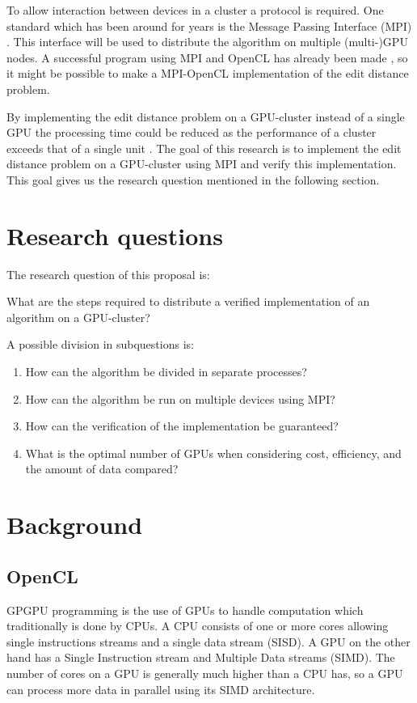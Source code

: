 \documentclass{sig-alternate-br}
\begin{document}
To allow interaction between devices in a cluster a protocol is required.
One standard which has been around for years is the Message Passing Interface (MPI) \cite{MPI}.
This interface will be used to distribute the algorithm on multiple (multi-)GPU nodes.
A successful program using MPI and OpenCL has already been made \cite{Cluster}, so it might be possible to make a MPI-OpenCL implementation of the edit distance problem.

By implementing the edit distance problem on a GPU-cluster instead of a single GPU the processing time could be reduced as the performance of a cluster exceeds that of a single unit \cite{Cluster}.
The goal of this research is to implement the edit distance problem on a GPU-cluster using MPI and verify this implementation.
This goal gives us the research question mentioned in the following section.

\section{Research questions}
The research question of this proposal is:

What are the steps required to distribute a verified implementation of an algorithm on a GPU-cluster?

A possible division in subquestions is:
\begin{enumerate}
    \item How can the algorithm be divided in separate processes?
    \item How can the algorithm be run on multiple devices using MPI?
    \item How can the verification of the implementation be guaranteed?
    \item What is the optimal number of GPUs when considering cost, efficiency, and the amount of data compared?
\end{enumerate}

\section{Background}
\subsection{OpenCL}
GPGPU programming is the use of GPUs to handle computation which traditionally is done by CPUs.
A CPU consists of one or more cores allowing single instructions streams and a single data stream (SISD).
A GPU on the other hand has a Single Instruction stream and Multiple Data streams (SIMD).
The number of cores on a GPU is generally much higher than a CPU has, so a GPU can process more data in parallel using its SIMD architecture.
\end{document}
